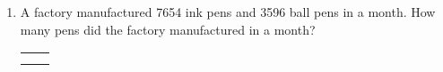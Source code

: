 \begin{enumerate}
    \item A factory manufactured 7654 ink pens and 3596 ball pens in a month. How many pens did the
        factory manufactured in a month?

    \begin{myTableStyle} \begin{tabular}{ |m{10cm}|m{3cm}| } \hline
        &  \\\hline
        &  \\\hline
        \multicolumn{2}{|c|}{} \\\hline
    \end{tabular} \end{myTableStyle} \vspace{0.08in}

\end{enumerate}
